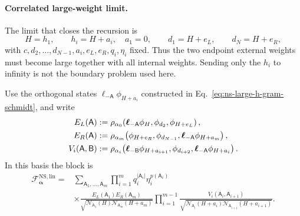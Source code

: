 \documentclass[11pt]{article}
\newcommand{\NS}{\mathrm{NS}}
\newcommand{\F}{\mathcal F}
\begin{document}
\paragraph{Correlated large-weight limit.}
The limit that closes the recursion is
\begin{equation}
 H=h_1,\qquad
 h_i=H+a_i,\quad a_1=0,\qquad
 d_1=H+e_L,\qquad d_N=H+e_R,
 \label{eq:ns-sphere-linear-fixed-difference-data}
\end{equation}
with \(c,d_2,\ldots,d_{N-1},a_i,e_L,e_R,q_i,\eta_i\) fixed.  Thus the two
endpoint external weights must become large together with all internal
weights.  Sending only the \(h_i\) to infinity is not the boundary problem
used here.

Use the orthogonal states
\(\boldsymbol\ell_{-\mathsf A}\phi_{H+a_i}\) constructed in
Eq.~\eqref{eq:ns-large-h-gram-schmidt}, and write
\begin{align}
 E_L(\mathsf A)
 &:=
 \rho_{\alpha_0}\!\left(
 \boldsymbol\ell_{-\mathsf A}\phi_H,
 \phi_{d_2},\phi_{H+e_L}\right),
 \notag\\
 E_R(\mathsf A)
 &:=
 \rho_{\alpha_m}\!\left(
 \phi_{H+e_R},\phi_{d_{N-1}},
 \boldsymbol\ell_{-\mathsf A}\phi_{H+a_m}\right),
 \label{eq:ns-sphere-linear-endpoint-vertices}\\
 V_i(\mathsf A,\mathsf B)
 &:=
 \rho_{\alpha_i}\!\left(
 \boldsymbol\ell_{-\mathsf B}\phi_{H+a_{i+1}},
 \phi_{d_{i+2}},
 \boldsymbol\ell_{-\mathsf A}\phi_{H+a_i}\right).
 \notag
\end{align}
In this basis the block is
\begin{equation}
 \begin{split}
 \F^{\NS,\mathrm{lin}}_{\boldsymbol\alpha}
 ={}&
 \sum_{\mathsf A_1,\ldots,\mathsf A_m}
 \prod_{i=1}^{m}
 q_i^{|\mathsf A_i|}\eta_i^{p(\mathsf A_i)}
 \\
 &\times
 \frac{E_L(\mathsf A_1)E_R(\mathsf A_m)}
 {\sqrt{\mathcal N_{\mathsf A_1}(H)
 \mathcal N_{\mathsf A_m}(H+a_m)}}
 \prod_{i=1}^{m-1}
 \frac{V_i(\mathsf A_i,\mathsf A_{i+1})}
 {\sqrt{\mathcal N_{\mathsf A_i}(H+a_i)
 \mathcal N_{\mathsf A_{i+1}}(H+a_{i+1})}} .
 \end{split}
 \label{eq:ns-sphere-linear-orthogonal-block}
\end{equation}
\end{document}

